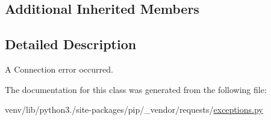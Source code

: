 \subsection*{Additional Inherited Members}


\subsection{Detailed Description}
\begin{DoxyVerb}A Connection error occurred.\end{DoxyVerb}
 

The documentation for this class was generated from the following file\+:\begin{DoxyCompactItemize}
\item 
venv/lib/python3./site-\/packages/pip/\+\_\+vendor/requests/\hyperlink{pip_2__vendor_2requests_2exceptions_8py}{exceptions.\+py}\end{DoxyCompactItemize}
